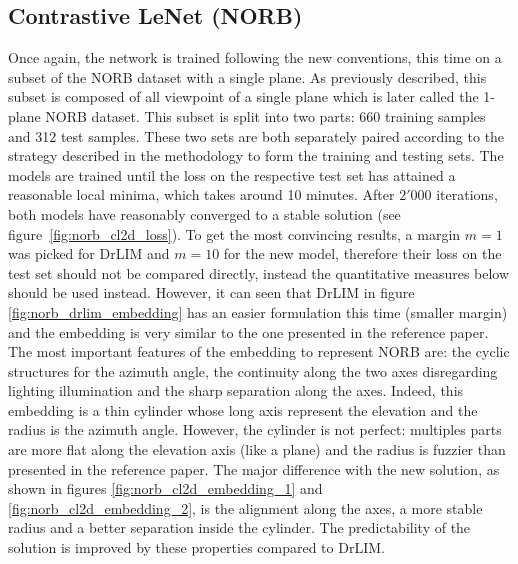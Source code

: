 \documentclass[a4paper,12pt]{report}
\begin{document}
\subsection{Contrastive LeNet (NORB)}
Once again, the network is trained following the new conventions, this time on a subset of the NORB dataset with a single plane.
As previously described, this subset is composed of all viewpoint of a single plane which is later called the 1-plane NORB dataset.
This subset is split into two parts: 660 training samples and 312 test samples.
These two sets are both separately paired according to the strategy described in the methodology to form the training and testing sets.
The models are trained until the loss on the respective test set has attained a reasonable local minima, which takes around 10 minutes.
After $2'000$ iterations, both models have reasonably converged to a stable solution (see figure~\ref{fig:norb_cl2d_loss}).
To get the most convincing results, a margin $m=1$ was picked for DrLIM and $m=10$ for the new model, therefore their loss on the test set should not be compared directly, instead the quantitative measures below should be used instead.
However, it can seen that DrLIM in figure \ref{fig:norb_drlim_embedding} has an easier formulation this time (smaller margin) and the embedding is very similar to the one presented in the reference paper.
The most important features of the embedding to represent NORB are: the cyclic structures for the azimuth angle, the continuity along the two axes disregarding lighting illumination and the sharp separation along the axes.
Indeed, this embedding is a thin cylinder whose long axis represent the elevation and the radius is the azimuth angle.
However, the cylinder is not perfect: multiples parts are more flat along the elevation axis (like a plane) and the radius is fuzzier than presented in the reference paper.
The major difference with the new solution, as shown in figures \ref{fig:norb_cl2d_embedding_1} and \ref{fig:norb_cl2d_embedding_2}, is the alignment along the axes, a more stable radius and a better separation inside the cylinder.
The predictability of the solution is improved by these properties compared to DrLIM.
\end{document}
